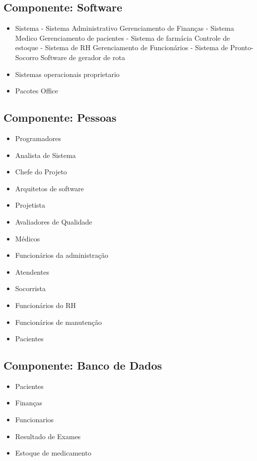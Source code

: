      \subsection{Componente: Software}
\begin{itemize}
\item Sistema
  \subitem - Sistema Administrativo
  \subsubitem * Gerenciamento de Finanças
  \subitem - Sistema Medico
  \subsubitem * Gerenciamento de pacientes
  \subitem - Sistema de farmácia
  \subsubitem * Controle de estoque
  \subitem - Sistema de RH
  \subsubitem * Gerenciamento de Funcionários
   \subitem - Sistema de Pronto-Socorro
  \subsubitem * Software de gerador de rota

  \item Sistemas operacionais proprietario
  \item Pacotes Office


\end{itemize}


     \subsection{Componente: Pessoas}


\begin{itemize}
\item Programadores
\item Analista de Sistema
\item Chefe do Projeto
\item Arquitetos de software
\item Projetista
\item Avaliadores de Qualidade
  \item   Médicos
  \item  Funcionários  da administração
  \item   Atendentes
  \item  Socorrista
  \item   Funcionários  do RH
  \item Funcionários de manutenção
  \item Pacientes
  \end{itemize}



     \subsection{Componente: Banco de Dados}
\begin{itemize}

  \item Pacientes
  \item Finanças
  \item Funcionarios
  \item Resultado de Exames
  \item Estoque de medicamento
  \end{itemize}


